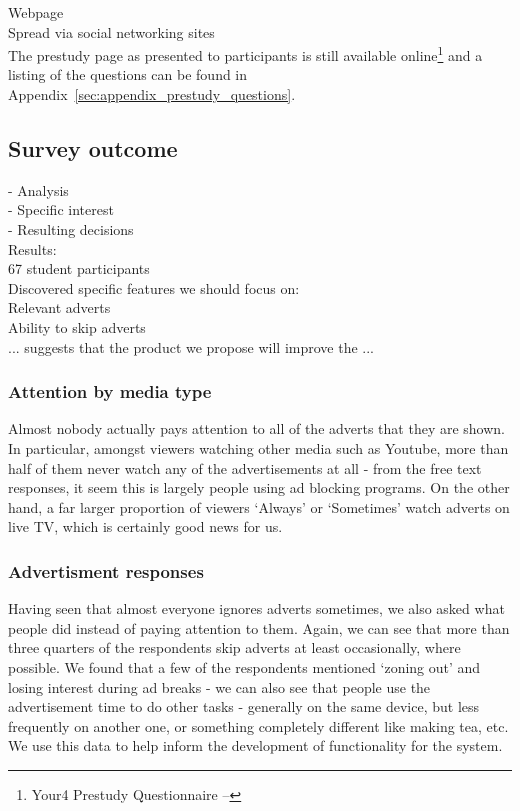 Webpage\\
Spread via social networking sites\\


The prestudy page as presented to participants is still available online\footnote{Your4 Prestudy Questionnaire -- } and a listing of the questions can be found in Appendix~\ref{sec:appendix_prestudy_questions}. %


\subsection{Survey outcome}



 - Analysis\\
  - Specific interest\\
  - Resulting decisions\\

Results:\\
67 student participants\\
Discovered specific features we should focus on:\\
Relevant adverts\\
Ability to skip adverts\\
... suggests that the product we propose will improve the ...

\subsubsection{Attention by media type}
Almost nobody actually pays attention to all of the adverts that they are shown. In particular, amongst viewers watching other media such as Youtube, more than half of them never watch any of the advertisements at all - from the free text responses, it seem this is largely people using ad blocking programs. On the other hand, a far larger proportion of viewers `Always' or `Sometimes' watch adverts on live TV, which is certainly good news for us.

\subsubsection{Advertisment responses}
Having seen that almost everyone ignores adverts sometimes, we also asked what people did instead of paying attention to them. Again, we can see that more than three quarters of the respondents skip adverts at least occasionally, where possible. We found that a few of the respondents mentioned `zoning out' and losing interest during ad breaks - we can also see that people use the advertisement time to do other tasks - generally on the same device, but less frequently on another one, or something completely different like making tea, etc. We use this data to help inform the development of functionality for the system.

